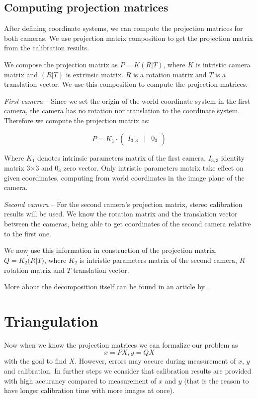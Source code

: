 \subsection{Computing projection matrices}
After defining coordinate systems, we can compute the projection matrices for
both cameras. We use projection matrix composition to get the projection matrix
from the calibration results.

We compose the projection matrix as $P = K(R|T)$, where $K$ is intristic
camera matrix and $(R|T)$ is extrinsic matrix. $R$ is a rotation matrix and
$T$ is a translation vector. We use this composition to compute the projection
matrices.

\emph{First camera} -- Since we set the origin of the world coordinate system
in the first camera, the camera has no rotation nor translation to the
coordinate system. Therefore we compute the projection matrix as:

\[
 P = K_1 \cdot \begin{pmatrix}
	I_{3, 3} & | & 0_3  
\end{pmatrix}
\]

Where $K_1$ denotes intrinsic parameters matrix of the first camera, $I_{3,3}$ identity
matrix 3$\times$3 and $0_3$ zero vector. Only intristic parameters matrix take
effect on given coordinates, computing from world coordinates in the image plane of the camera.

\emph{Second camera} -- For the second camera's projection matrix, stereo
calibration results will be used. We know the rotation matrix and the
translation vector between the cameras, being able to get coordinates of the
second camera relative to the first one.

We now use this information in construction of the projection matrix, $Q = K_2
\dot (R | T)$, where $K_2$ is intristic parameters matrix of the second camera, $R$
rotation matrix and $T$ translation vector.

More about the decomposition itself can be found in an article by
\citet{computervisionblog}.


\section{Triangulation}

Now when we know the projection matrices we can formalize our problem as
\begin{equation}
x = PX, y = QX \label{projection-statements}
\end{equation}
with the goal to find $X$. However, errors may occure during
measurement of $x$, $y$ and calibration. In further steps we consider that
calibration results are provided with high accurancy compared to measurement of
$x$ and $y$ (that is the reason to have longer calibration time with more images
at once).

